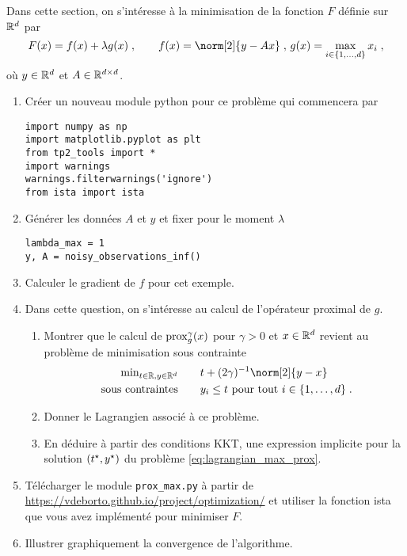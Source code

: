 \documentclass[a4paper,french,12pt]{article}
\begin{document}
Dans cette section, on s'intéresse à la minimisation de la fonction $F$ définie sur $\mathbb{R}^d$ par
\begin{equation*}
  F(x) = f(x) + \lambda g(x) \eqsp, \qquad f(x) = \norm[2]{y-Ax} \eqsp, \, g(x)= \max_{i \in \{1,\ldots,d\}} x_i \eqsp,
\end{equation*}
où $y \in \mathbb{R}^d$ et $A \in \mathbb{R}^{d\times d}$. 
\begin{enumerate}
\item Créer un nouveau module python pour ce problème qui commencera par
\begin{lstlisting}
import numpy as np
import matplotlib.pyplot as plt
from tp2_tools import *
import warnings
warnings.filterwarnings('ignore')
from ista import ista
\end{lstlisting}
\item Générer les données $A$ et $y$ et fixer pour le moment $\lambda$
  \begin{lstlisting}
lambda_max = 1
y, A = noisy_observations_inf()
  \end{lstlisting}
\item Calculer le gradient de $f$ pour cet exemple.
\item Dans cette question, on s'intéresse au calcul de l'opérateur proximal de $g$.
  \begin{enumerate}
  \item Montrer que le calcul de $\operatorname{prox}_g^{\gamma}(x)$ pour $\gamma>0$ et $x \in \mathbb{R}^d$ revient au problème de minimisation sous contrainte
    \begin{equation}
      \label{eq:lagrangian_max_prox}
      \begin{aligned}
      \text{min}_{t \in \rset, y \in \rset^d} &\qquad t + (2\gamma)^{-1} \norm[2]{y-x} \\
      \text{ sous contraintes} &\qquad y_i \leq t \text{ pour tout $i \in \{1,\ldots,d\}$} \eqsp.
      \end{aligned}
    \end{equation}
  \item Donner le Lagrangien associé à ce problème.
  \item En déduire à partir des conditions KKT, une expression
    implicite pour la solution $(t^{\star},y^{\star})$ du problème \eqref{eq:lagrangian_max_prox}.     
  \end{enumerate}
  
\item Télécharger le module  \lstinline+prox_max.py+ à partir de \url{https://vdeborto.github.io/project/optimization/} et utiliser la fonction ista que vous avez implémenté pour minimiser $F$.
  
\item Illustrer graphiquement la convergence de l'algorithme. 
\end{enumerate}
\end{document}
